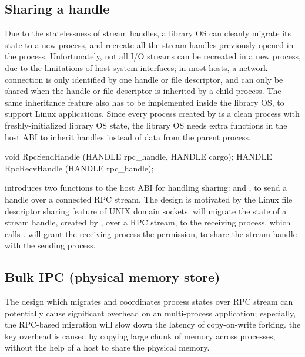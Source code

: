 \subsection*{Sharing a handle}




Due to the statelessness of stream handles,
a library OS can cleanly migrate its state to a new process, and recreate all the stream handles previously opened in the process.
Unfortunately, not all I/O streams can be recreated
in a new process, due to the limitations of host system interfaces;
in most hosts, a network connection is only identified by one handle or file descriptor,
and can only be shared when the handle or file descriptor
is inherited by a child process.
The same inheritance feature also has to be implemented
inside the library OS, to support Linux applications.
Since every process created by  is a clean \graphene{} process with freshly-initialized library OS state,
the library OS needs extra functions in the host ABI
to inherit handles instead of data from the parent process.


\begin{paldef}
void   RpcSendHandle (HANDLE rpc_handle, HANDLE cargo);
HANDLE RpcRecvHandle (HANDLE rpc_handle);
\end{paldef}



\graphene{} introduces two functions to the host ABI for handling sharing:  and , to send a handle over a connected RPC stream.
The design is motivated by the Linux file descriptor sharing feature of UNIX domain sockets.
 will migrate the state of a stream handle, created by ,
over a RPC stream, to the receiving process, which calls .
 will grant the receiving process the permission, to share the stream handle with the sending process.


\subsection*{Bulk IPC (physical memory store)}


The \graphene{} design which migrates and coordinates process states over RPC stream
can potentially cause significant overhead on an multi-process application;
especially, the RPC-based migration will slow down the latency of copy-on-write forking.
the key overhead
is caused by copying large chunk of memory
across processes, without the help of a host to share the physical memory.

